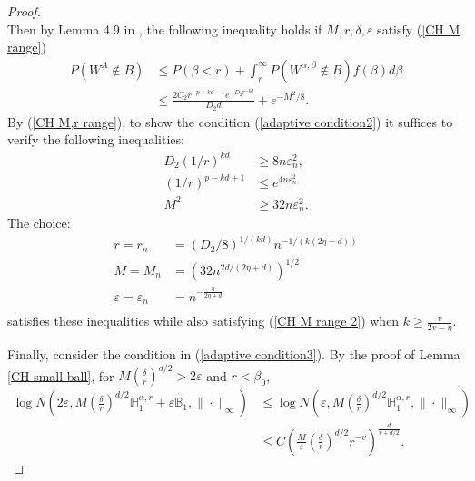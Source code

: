 \documentclass[ejs,noshowframe]{imsart}
\theoremstyle{plain}
\theoremstyle{definition}
\theoremstyle{remark}
\begin{document}
\begin{appendix}
\begin{proof}
\begin{equation}
\end{equation}
Then by Lemma 4.9 in \cite{van2009adaptive}, the following inequality holds if  $M, r, \delta, \varepsilon$ satisfy  (\ref{CH M range})
\begin{equation}\label{CH M,r range}
\begin{aligned}
P\left(W^A \notin B\right) & \leq P(\beta<r)+\int_r^\infty P\left(W^{\alpha,\beta} \notin B\right) f({\beta}) d {\beta} \\
& \leq \frac{2 C_2 r^{-p+kd-1} e^{-D_2 r^{-kd} }}{D_2 d }+e^{-M^2 / 8}.
\end{aligned}
\end{equation}
By   (\ref{CH M,r range}), to show the condition (\ref{adaptive condition2}) it suffices to verify the following inequalities:
\begin{equation} \label{CH M range 2}
\begin{aligned}
D_2 (1/r)^{kd} & \geq 8 n \varepsilon_n^2, \\
(1/r)^{p-kd+1} & \leq e^{4 n \varepsilon_n^2,} \\
M^2 & \geq 32 n \varepsilon_n^2.
\end{aligned}
\end{equation}
The choice:
\begin{equation} \label{CH solution of M,r}
    \begin{aligned}
r=r_n&=({D_2}/{8})^{1/(kd)}n^{-1/(k(2 \eta+d))}\\
M=M_n&=(32n^{{2d}/(2 \eta+d)})^{1/2}\\
\varepsilon=\varepsilon_n&=n^{-\frac{\eta}{2\eta+d}}\\
\end{aligned}
\end{equation}
 satisfies these inequalities while also satisfying (\ref{CH M range 2}) when $k \ge \frac{v}{2v-\eta}$.

Finally, consider the condition in  (\ref{adaptive condition3}). By the proof of Lemma \ref{CH small ball}, for $M (\frac{\delta}{r})^{d/2}>2 \varepsilon$ and $r< \beta_0$,
$$
\begin{aligned}
\log N\left(2 \varepsilon, M (\frac{\delta}{r})^{d/2} \mathbb{H}_1^{\alpha,r}+\varepsilon \mathbb{B}_1,\|\cdot\|_{\infty}\right) & \leq \log N\left(\varepsilon, M (\frac{\delta}{r})^{d/2} \mathbb{H}_1^{\alpha,r},\|\cdot\|_{\infty}\right) \\
& \leq C \left( \frac{M}{\varepsilon} (\frac{\delta}{r})^{d/2}r^{-v}  \right)^{\frac{d}{v+d/2}} .
\end{aligned}
$$


\end{proof}
\end{appendix}
\end{document}
